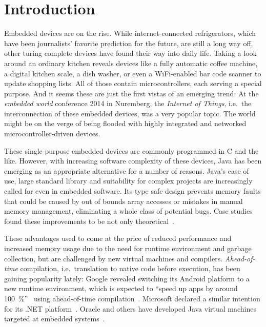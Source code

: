 
\chapter{Introduction}
	\label{chapter:intro}
	Embedded devices are on the rise. While internet-connected refrigerators, which have been journalists' favorite
	prediction for the future, are still a long way off, other turing complete devices have found their way into daily
	life. Taking a look around an ordinary kitchen reveals devices like a fully automatic coffee machine, a digital
	kitchen scale, a dish washer, or even a WiFi-enabled bar code scanner to update shopping lists. All of those contain
	microcontrollers, each serving a special purpose. And it seems these are just the first vistas of an emerging trend:
	At the \emph{embedded world} conference 2014 in Nuremberg, the \emph{Internet of Things}, i.e.\ the interconnection of
	these embedded devices, was a very popular topic. The world might be on the verge of being flooded with highly
	integrated and networked microcontroller-driven devices.


	These single-purpose embedded devices are commonly programmed in C and the like. However, with increasing software
	complexity of these devices, Java has been emerging as an appropriate alternative for a number of reasons. Java's ease
	of use, large standard library and suitability for complex projects are increasingly called for even in embedded
	software. Its type safe design prevents memory faults that could be caused by out of bounds array accesses or mistakes
	in manual memory management, eliminating a whole class of potential bugs. Case studies found these improvements to be
	not only theoretical~\cite{phipps:99:spe}.

	These advantages used to come at the price of reduced performance and increased memory usage due to the need for
	runtime environment and garbage collection, but are challenged by new virtual machines and compilers.
	\emph{Ahead-of-time} compilation, i.e.\ translation to native code before execution, has been gaining popularity
	lately: Google revealed switching its Android platform to a new runtime environment, which is expected to
	\enquote{speed up apps by around 100~\%}~\cite{anthony:13:android-art} using ahead-of-time
	compilation~\cite{lindner:14:android-art}. Microsoft declared a similar intention for its .NET
	platform~\cite{lardinois:14:dotnet-aot}. Oracle and others have developed Java virtual machines targeted at embedded
	systems~\cite{merritt:13:java-for-IoT, maxfield:12:IS2T-JVM}.

